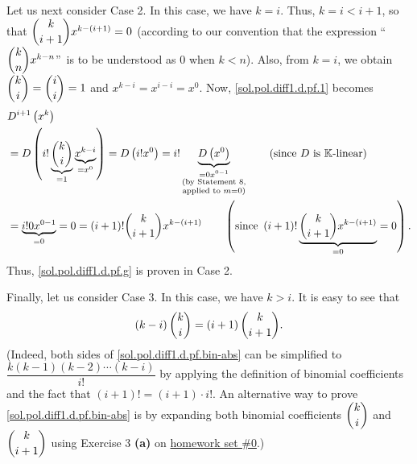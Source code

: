 \documentclass[paper=a4, fontsize=12pt]{scrartcl}%
\theoremstyle{plainsl}
\theoremstyle{definition}
\theoremstyle{remark}
\begin{document}
Let us next consider Case 2. In this case, we have $k=i$. Thus, $k=i<i+1$, so
that $\dbinom{k}{i+1}x^{k-\left(  i+1\right)  }=0$ (according to our
convention that the expression \textquotedblleft$\dbinom{k}{n}x^{k-n}%
$\textquotedblright\ is to be understood as $0$ when $k<n$). Also, from $k=i$,
we obtain $\dbinom{k}{i}=\dbinom{i}{i}=1$ and $x^{k-i}=x^{i-i}=x^{0}$. Now,
\eqref{sol.pol.diff1.d.pf.1} becomes%
\begin{align*}
&  D^{i+1}\left(  x^{k}\right) \\
&  =D\left(  i!\underbrace{\dbinom{k}{i}}_{=1}\underbrace{x^{k-i}}_{=x^{0}%
}\right)  =D\left(  i!x^{0}\right)  =i!\underbrace{D\left(  x^{0}\right)
}_{\substack{=0x^{0-1}\\\text{(by Statement 8,}\\\text{applied to }%
m=0\text{)}}}\qquad\left(  \text{since }D\text{ is }\mathbb{K}\text{-linear}%
\right) \\
&  =\underbrace{i!0x^{0-1}}_{=0}=0=\left(  i+1\right)  !\dbinom{k}%
{i+1}x^{k-\left(  i+1\right)  }\qquad\left(  \text{since }\left(  i+1\right)
!\underbrace{\dbinom{k}{i+1}x^{k-\left(  i+1\right)  }}_{=0}=0\right)  .
\end{align*}
Thus, \eqref{sol.pol.diff1.d.pf.g} is proven in Case 2.

Finally, let us consider Case 3. In this case, we have $k>i$. It is easy to
see that
\begin{equation}
\left(  k-i\right)  \dbinom{k}{i}=\left(  i+1\right)  \dbinom{k}{i+1}.
\label{sol.pol.diff1.d.pf.bin-abs}%
\end{equation}
(Indeed, both sides of \eqref{sol.pol.diff1.d.pf.bin-abs} can be simplified to
$\dfrac{k\left(  k-1\right)  \left(  k-2\right)  \cdots\left(  k-i\right)
}{i!}$ by applying the definition of binomial coefficients and the fact that
$\left(  i+1\right)  !=\left(  i+1\right)  \cdot i!$. An alternative way to
prove \eqref{sol.pol.diff1.d.pf.bin-abs} is by expanding both binomial
coefficients $\dbinom{k}{i}$ and $\dbinom{k}{i+1}$ using Exercise 3
\textbf{(a)} on
\href{http://www.cip.ifi.lmu.de/~grinberg/t/19s/index.html}{homework set \#0}.)
\end{document}
